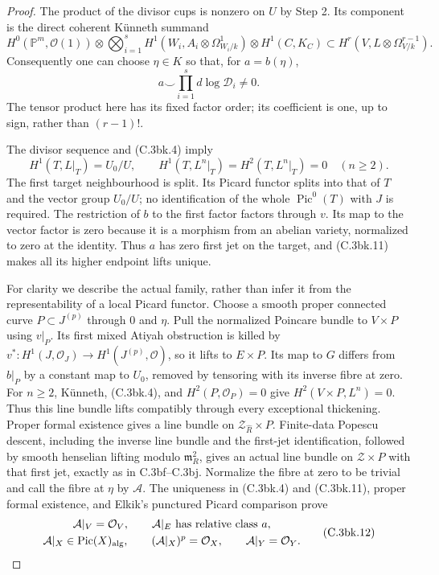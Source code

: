 \begin{proof}
The product of the divisor cups is nonzero on $U$ by Step 2.
Its component is the direct coherent K\"unneth summand
\[
 H^0(\mathbb P^m,\mathcal O(1))\otimes
       \bigotimes_{i=1}^s H^1(W_i,A_i\otimes\Omega^1_{W_i/k})
       \otimes H^1(C,K_C)
 \subset H^r(V,L\otimes\Omega^{r-1}_{V/k}).
 \tag{C.3bk.9}
\]
Consequently one can choose $\eta\in K$ so that, for $a=b(\eta)$,
\[
 a\smile\prod_{i=1}^s d\log\mathcal D_i\ne0.
 \tag{C.3bk.10}
\]
The tensor product here has its fixed factor order; its coefficient
is one, up to sign, rather than $(r-1)!$.

The divisor sequence and (C.3bk.4) imply
\[
 H^1(T,L|_T)=U_0/U,\qquad
 H^1(T,L^n|_T)=H^2(T,L^n|_T)=0\quad(n\ge2).
 \tag{C.3bk.11}
\]
The first target neighbourhood is split. Its Picard functor splits
into that of $T$ and the vector group $U_0/U$; no identification
of the whole $\operatorname{Pic}^0(T)$ with $J$ is required.
The restriction of $b$ to the first factor factors through $v$.
Its map to the vector factor is zero because it is a morphism from
an abelian variety, normalized to zero at the identity. Thus $a$
has zero first jet on the target, and (C.3bk.11) makes all its
higher endpoint lifts unique.

For clarity we describe the actual family, rather than infer it
from the representability of a local Picard functor. Choose a smooth
proper connected curve $P\subset J^{(p)}$ through $0$ and $\eta$.
Pull the normalized Poincare bundle to $V\times P$ using $v|_P$.
Its first mixed Atiyah obstruction is killed by
$v^*:H^1(J,\mathcal O_J)\to H^1(J^{(p)},\mathcal O)$,
so it lifts to $E\times P$. Its map to $G$ differs from $b|_P$
by a constant map to $U_0$, removed by tensoring with its inverse
fibre at zero. For $n\ge2$, K\"unneth, (C.3bk.4), and
$H^2(P,\mathcal O_P)=0$ give $H^2(V\times P,L^n)=0$.
Thus this line bundle lifts compatibly through every exceptional
thickening. Proper formal existence gives a line bundle on
$\mathcal Z_{\widehat R}\times P$.
Finite-data Popescu descent, including the inverse line bundle and
the first-jet identification, followed by smooth henselian lifting
modulo $\mathfrak m_R^2$, gives an actual line bundle on
$\mathcal Z\times P$ with that first jet, exactly as in C.3bf--C.3bj.
Normalize the fibre at zero to be trivial and call the fibre at
$\eta$ by $\mathcal A$.
The uniqueness in (C.3bk.4) and (C.3bk.11), proper formal existence,
and Elkik's punctured Picard comparison
\citep[unnumbered corollary, p.~573]{D_Elkik1973} prove
\[
 \begin{gathered}
 \mathcal A|_V=\mathcal O_V,\qquad
 \mathcal A|_E\text{ has relative class }a,\\
 \mathcal A|_X\in\operatorname{Pic}(X)_{\rm alg},\qquad
 (\mathcal A|_X)^p=\mathcal O_X,\qquad
 \mathcal A|_Y=\mathcal O_Y.
 \end{gathered}
 \tag{C.3bk.12}
\]


\end{proof}
